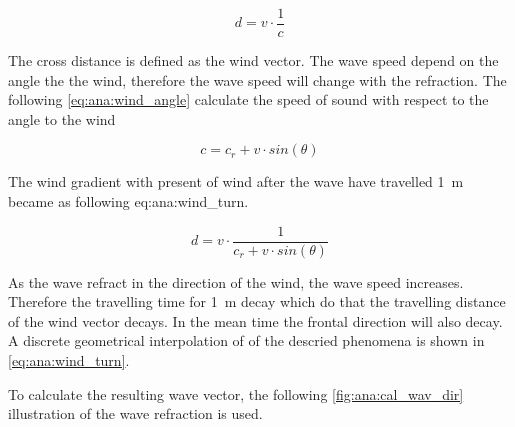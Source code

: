 \begin{equation}\label{eq:ana:wind_turn}
d = v \cdot \frac{1}{c}
\end{equation} 

\startexplain
{}
\stopexplain


The cross distance is defined as the wind vector. The wave speed depend on the angle the the wind, therefore the wave speed will change with the refraction. The following \autoref{eq:ana:wind_angle} calculate the speed of sound with respect to the angle to the wind 


\begin{equation}\label{eq:ana:wind_angle}
c = c_r+v \cdot sin(\theta)
\end{equation}

\startexplain
{}
\stopexplain

The wind gradient with present of wind after the wave have travelled \SI{1}{\meter} became as following {eq:ana:wind_turn}.

\begin{equation}\label{eq:ana:wind_turn}
d = v \cdot \frac{1}{c_r+v \cdot sin(\theta)}
\end{equation} 

As the wave refract in the direction of the wind, the wave speed increases. Therefore the travelling time for \SI{1}{\meter} decay which do that the travelling distance of the wind vector decays. In the mean time the frontal direction will also decay.  A discrete geometrical interpolation of of the descried phenomena is shown in  \autoref{eq:ana:wind_turn}.




To calculate the resulting wave vector, the following \autoref{fig:ana:cal_wav_dir} illustration of the wave refraction is used.


\startexplain
{}
\stopexplain


